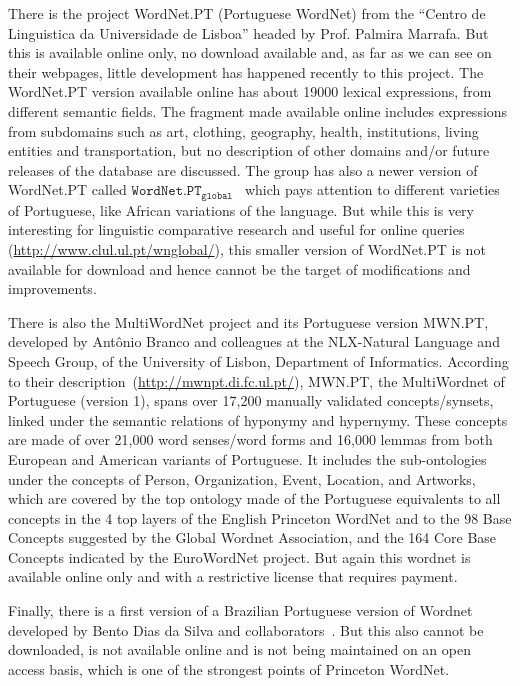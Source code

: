 \documentclass[a4paper,twocolumn]{article}
\begin{document}
There is the project WordNet.PT (Portuguese WordNet) from the ``Centro
de Linguistica da Universidade de Lisboa'' headed by Prof. Palmira
Marrafa.  But this is available online only, no download available
and, as far as we can see on their webpages, little development has
happened recently to this project. The WordNet.PT version available
online has about 19000 lexical expressions, from different semantic
fields.  The fragment made available online includes expressions from
subdomains such as art, clothing, geography, health, institutions,
living entities and transportation, but no description of other
domains and/or future releases of the database are discussed. The
group has also a newer version of WordNet.PT called
$\texttt{WordNet.PT}_{\texttt{global}}$~\cite{mam:2011:DIALECTS} which
pays attention to different varieties of Portuguese, like African
variations of the language. But while this is very interesting for
linguistic comparative research and useful for online queries
(\url{http://www.clul.ul.pt/wnglobal/}), this smaller version of
WordNet.PT is not available for download and hence cannot  be the target of modifications and
improvements.

There is also the MultiWordNet project and its Portuguese version
MWN.PT, developed by Ant\^onio Branco and colleagues at the
NLX-Natural Language and Speech Group, of the University of Lisbon,
Department of Informatics. According to their
description~(\url{http://mwnpt.di.fc.ul.pt/}), MWN.PT, the
MultiWordnet of Portuguese (version 1), spans over 17,200 manually
validated concepts/synsets, linked under the semantic relations of
hyponymy and hypernymy. These concepts are made of over 21,000 word
senses/word forms and 16,000 lemmas from both European and American
variants of Portuguese. It includes the sub-ontologies under the
concepts of Person, Organization, Event, Location, and Artworks, which
are covered by the top ontology made of the Portuguese equivalents to
all concepts in the 4 top layers of the English Princeton WordNet and
to the 98 Base Concepts suggested by the Global Wordnet Association,
and the 164 Core Base Concepts indicated by the EuroWordNet
project. But again this wordnet is available online only and with a
restrictive license that requires payment.

Finally, there is a first version of a Brazilian Portuguese version of
Wordnet developed by Bento Dias da Silva and
collaborators~\cite{bento,carolina}. But this also cannot be
downloaded, is not available online and is not being maintained on an
open access basis, which is one of the strongest points of Princeton
WordNet.
\end{document}

